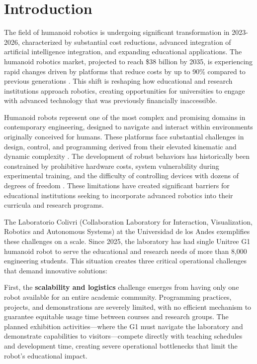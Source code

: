 \documentclass[12pt,a4paper]{article}
\begin{document}
\newpage


\section{Introduction}

The field of humanoid robotics is undergoing significant transformation in 2023-2026, characterized by substantial cost reductions, advanced integration of artificial intelligence integration, and expanding educational applications. The humanoid robotics market, projected to reach \$38 billion by 2035, is experiencing rapid changes driven by platforms that reduce costs by up to 90\% compared to previous generations \parencite{marketsandmarkets2024}. This shift is reshaping how educational and research institutions approach robotics, creating opportunities for universities to engage with advanced technology that was previously financially inaccessible.

Humanoid robots represent one of the most complex and promising domains in contemporary engineering, designed to navigate and interact within environments originally conceived for humans. These platforms face substantial challenges in design, control, and programming derived from their elevated kinematic and dynamic complexity \parencite{radosavovic2024realworld}. The development of robust behaviors has historically been constrained by prohibitive hardware costs, system vulnerability during experimental training, and the difficulty of controlling devices with dozens of degrees of freedom \parencite{gu2024humanoidgym}. These limitations have created significant barriers for educational institutions seeking to incorporate advanced robotics into their curricula and research programs.

The Laboratorio Colivri (Collaboration Laboratory for Interaction, Visualization, Robotics and Autonomous Systems) at the Universidad de los Andes exemplifies these challenges on a scale. Since 2025, the laboratory has had single Unitree G1 humanoid robot to serve the educational and research needs of more than 8,000 engineering students. This situation creates three critical operational challenges that demand innovative solutions:

First, the \textbf{scalability and logistics} challenge emerges from having only one robot available for an entire academic community. Programming practices, projects, and demonstrations are severely limited, with no efficient mechanism to guarantee equitable usage time between courses and research groups. The planned exhibition activities—where the G1 must navigate the laboratory and demonstrate capabilities to visitors—compete directly with teaching schedules and development time, creating severe operational bottlenecks that limit the robot's educational impact.
\end{document}
